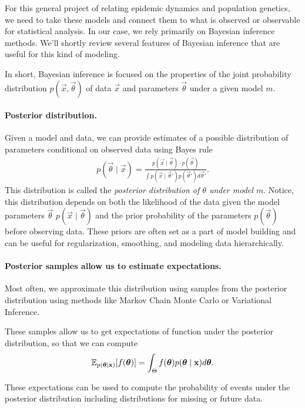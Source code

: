 For this general project of relating epidemic dynamics and population genetics, we need to take these models and connect them to what is observed or observable for statistical analysis.
In our case, we rely primarily on Bayesian inference methods.
We'll shortly review several features of Bayesian inference that are useful for this kind of modeling.

In short, Bayesian inference is focused on the properties of the joint probability distribution  $p(\vec{x}, \vec{\theta})$ of data $\vec{x}$ and parameters $\vec{\theta}$ under a given model $m$.

\paragraph{Posterior distribution.}
Given a model and data, we can provide estimates of a possible distribution of parameters conditional on observed data using Bayes rule
\begin{align}
p(\vec{\theta} \mid \vec{x}) = \frac{p(\vec{x} \mid \vec{\theta})\cdot p(\vec{\theta})}{\int p(\vec{x} \mid \vec{\theta}') p(\vec{\theta}') d \vec{\theta}'}.
\end{align}
This distribution is called the \emph{posterior distribution of $\theta$ under model $m$}.
Notice, this distribution depends on both the likelihood of the data given the model parameters $\vec{\theta}$ $p(\vec{x} \mid \vec{\theta})$ and the prior probability of the parameters $p(\vec{\theta})$ before observing data.
These priors are often set as a part of model building and can be useful for regularization, smoothing, and modeling data hierarchically.

\paragraph{Posterior samples allow us to estimate expectations.}%

Most often, we approximate this distribution using samples from the posterior distribution using methods like Markov Chain Monte Carlo or Variational Inference.

These samples allow us to get expectations of function under the posterior distribution, so that we can compute
\begin{align}
\mathbb{E}_{p(\boldsymbol{\mathbf{\theta}} \mid \boldsymbol{\mathbf{x}})}[f(\boldsymbol{\mathbf{\theta}})] = \int_{\Theta} f(\boldsymbol{\mathbf{\theta}}) p(\boldsymbol{\mathbf{\theta}} \mid \boldsymbol{\mathbf{x}}) d \boldsymbol{\mathbf{\theta}}.
\end{align}

These expectations can be used to compute the probability of events under the posterior distribution including distributions for missing or future data.

